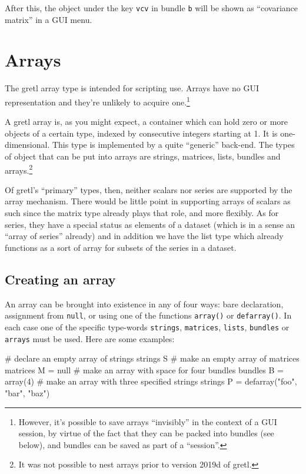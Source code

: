 After this, the object under the key \texttt{vcv} in bundle \texttt{b}
will be shown as ``covariance matrix'' in a GUI menu.

\section{Arrays}
\label{sec:arrays}

The gretl array type is intended for scripting use. Arrays have no GUI
representation and they're unlikely to acquire one.\footnote{However,
  it's possible to save arrays ``invisibly'' in the context of a GUI
  session, by virtue of the fact that they can be packed into bundles
  (see below), and bundles can be saved as part of a ``session''.}

A gretl array is, as you might expect, a container which can hold zero
or more objects of a certain type, indexed by consecutive integers
starting at 1. It is one-dimensional. This type is implemented by a
quite ``generic'' back-end. The types of object that can be put into
arrays are strings, matrices, lists, bundles and arrays.\footnote{It
  was not possible to nest arrays prior to version 2019d of gretl.}

Of gretl's ``primary'' types, then, neither scalars nor series are
supported by the array mechanism. There would be little point in
supporting arrays of scalars as such since the matrix type already
plays that role, and more flexibly. As for series, they have a special
status as elements of a dataset (which is in a sense an ``array of
series'' already) and in addition we have the list type which already
functions as a sort of array for subsets of the series in a dataset.

\subsection{Creating an array}

An array can be brought into existence in any of four ways: bare
declaration, assignment from \texttt{null}, or using one of the
functions \texttt{array()} or \texttt{defarray()}.  In each case one
of the specific type-words \texttt{strings}, \texttt{matrices},
\texttt{lists}, \texttt{bundles} or \texttt{arrays} must be used. Here
are some examples:

\begin{code}
# declare an empty array of strings
strings S
# make an empty array of matrices
matrices M = null
# make an array with space for four bundles
bundles B = array(4)
# make an array with three specified strings
strings P = defarray("foo", "bar", "baz")
\end{code}

